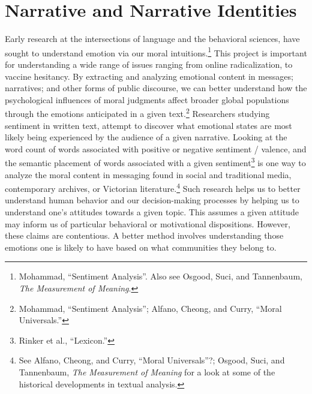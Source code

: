 \documentclass[phdthesis,12pt,final]{wuthesis}
\theoremstyle{definition}
\theoremstyle{definition}
\theoremstyle{definition}
\theoremstyle{definition}
\theoremstyle{remark}
\begin{document}
\section{Narrative and Narrative Identities}\label{narrative-and-narrative-identities-1}

Early research at the intersections of language and the behavioral sciences, have sought to understand emotion via our moral intuitions.\footnote{Mohammad, {``Sentiment {Analysis}''}. Also see Osgood, Suci, and Tannenbaum, \emph{The Measurement of Meaning}.} This project is important for understanding a wide range of issues ranging from online radicalization, to vaccine hesitancy. By extracting and analyzing emotional content in messages; narratives; and other forms of public discourse, we can better understand how the psychological influences of moral judgments affect broader global populations through the emotions anticipated in a given text.\footnote{Mohammad, {``Sentiment {Analysis}''}; Alfano, Cheong, and Curry, {``Moral {Universals}.''}} Researchers studying sentiment in written text, attempt to discover what emotional states are most likely being experienced by the audience of a given narrative. Looking at the word count of words associated with positive or negative sentiment / valence, and the semantic placement of words associated with a given sentiment\footnote{Rinker et al., {``Lexicon.''}} is one way to analyze the moral content in messaging found in social and traditional media, contemporary archives, or Victorian literature.\footnote{See Alfano, Cheong, and Curry, {``Moral {Universals}''}?; Osgood, Suci, and Tannenbaum, \emph{The Measurement of Meaning} for a look at some of the historical developments in textual analysis.} Such research helps us to better understand human behavior and our decision-making processes by helping us to understand one's attitudes towards a given topic. This assumes a given attitude may inform us of particular behavioral or motivational dispositions. However, these claims are contentious. A better method involves understanding those emotions one is likely to have based on what communities they belong to.
\end{document}
